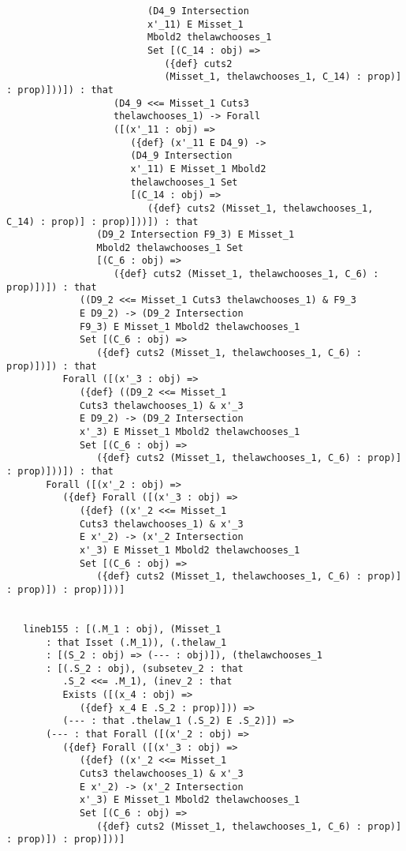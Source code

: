 \documentclass[12pt]{article}
\begin{document}
\begin{verbatim}
                         (D4_9 Intersection 
                         x'_11) E Misset_1 
                         Mbold2 thelawchooses_1 
                         Set [(C_14 : obj) => 
                            ({def} cuts2 
                            (Misset_1, thelawchooses_1, C_14) : prop)] : prop)]))]) : that 
                   (D4_9 <<= Misset_1 Cuts3 
                   thelawchooses_1) -> Forall 
                   ([(x'_11 : obj) => 
                      ({def} (x'_11 E D4_9) -> 
                      (D4_9 Intersection 
                      x'_11) E Misset_1 Mbold2 
                      thelawchooses_1 Set 
                      [(C_14 : obj) => 
                         ({def} cuts2 (Misset_1, thelawchooses_1, C_14) : prop)] : prop)]))]) : that 
                (D9_2 Intersection F9_3) E Misset_1 
                Mbold2 thelawchooses_1 Set 
                [(C_6 : obj) => 
                   ({def} cuts2 (Misset_1, thelawchooses_1, C_6) : prop)])]) : that 
             ((D9_2 <<= Misset_1 Cuts3 thelawchooses_1) & F9_3 
             E D9_2) -> (D9_2 Intersection 
             F9_3) E Misset_1 Mbold2 thelawchooses_1 
             Set [(C_6 : obj) => 
                ({def} cuts2 (Misset_1, thelawchooses_1, C_6) : prop)])]) : that 
          Forall ([(x'_3 : obj) => 
             ({def} ((D9_2 <<= Misset_1 
             Cuts3 thelawchooses_1) & x'_3 
             E D9_2) -> (D9_2 Intersection 
             x'_3) E Misset_1 Mbold2 thelawchooses_1 
             Set [(C_6 : obj) => 
                ({def} cuts2 (Misset_1, thelawchooses_1, C_6) : prop)] : prop)]))]) : that 
       Forall ([(x'_2 : obj) => 
          ({def} Forall ([(x'_3 : obj) => 
             ({def} ((x'_2 <<= Misset_1 
             Cuts3 thelawchooses_1) & x'_3 
             E x'_2) -> (x'_2 Intersection 
             x'_3) E Misset_1 Mbold2 thelawchooses_1 
             Set [(C_6 : obj) => 
                ({def} cuts2 (Misset_1, thelawchooses_1, C_6) : prop)] : prop)]) : prop)]))]


   lineb155 : [(.M_1 : obj), (Misset_1 
       : that Isset (.M_1)), (.thelaw_1 
       : [(S_2 : obj) => (--- : obj)]), (thelawchooses_1 
       : [(.S_2 : obj), (subsetev_2 : that 
          .S_2 <<= .M_1), (inev_2 : that 
          Exists ([(x_4 : obj) => 
             ({def} x_4 E .S_2 : prop)])) => 
          (--- : that .thelaw_1 (.S_2) E .S_2)]) => 
       (--- : that Forall ([(x'_2 : obj) => 
          ({def} Forall ([(x'_3 : obj) => 
             ({def} ((x'_2 <<= Misset_1 
             Cuts3 thelawchooses_1) & x'_3 
             E x'_2) -> (x'_2 Intersection 
             x'_3) E Misset_1 Mbold2 thelawchooses_1 
             Set [(C_6 : obj) => 
                ({def} cuts2 (Misset_1, thelawchooses_1, C_6) : prop)] : prop)]) : prop)]))]



\end{verbatim}
\end{document}
